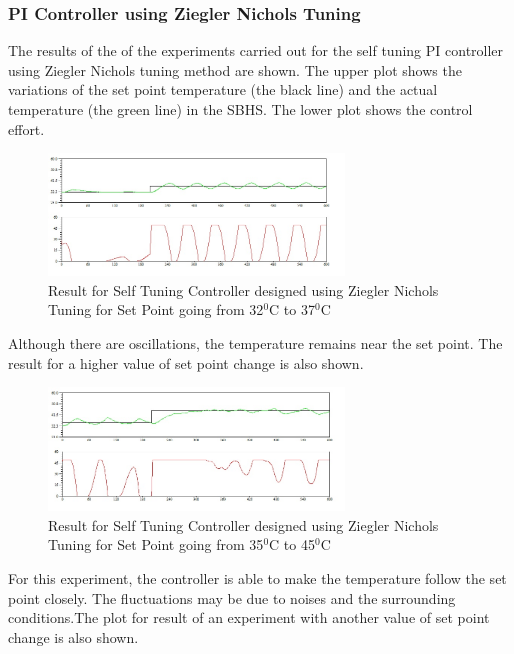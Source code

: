 \subsubsection{PI Controller using Ziegler Nichols Tuning}
The results of the of the experiments carried out for the self tuning PI controller using Ziegler Nichols tuning method are shown. The upper plot shows the variations of the set point temperature (the black line) and the actual temperature (the green line) in the SBHS. The lower plot shows the control effort.
\begin{figure}[h]
	
		\centering
\includegraphics[width=0.7\textwidth]{Vikas_self/report_tex/PID_results/self_tuning/NewSetpoint_change/PI/step32to37.jpg}
		\caption{Result for Self Tuning Controller designed using Ziegler Nichols Tuning for Set Point going from 32$^0$C to 37$^0$C}
\end{figure}

Although there are oscillations, the temperature remains near the set point. The result for a higher value of set point change is also shown.
\begin{figure}[h]
	\centering
\includegraphics[width=0.7\textwidth]{Vikas_self/report_tex/PID_results/self_tuning/NewSetpoint_change/PI/step35to45.jpg}
		\caption{Result for Self Tuning Controller designed using Ziegler Nichols Tuning for Set Point going from 35$^0$C to 45$^0$C}

	
\end{figure}

For this experiment, the controller is able to make the temperature follow the set point closely. The fluctuations may be due to noises and the surrounding conditions.The plot for result of an experiment with another value of set point change is also shown.

